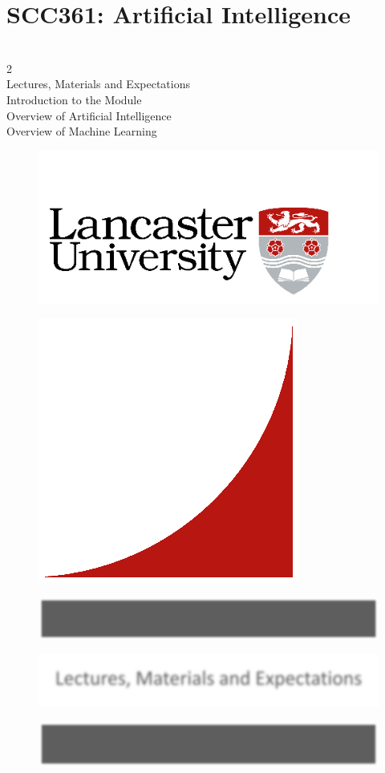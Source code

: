 \documentclass[12pt]{article}
\begin{document}
\section{SCC361: Artificial Intelligence}
\\
2\\
Lectures, Materials and Expectations\\
Introduction to the Module\\
Overview of Artificial Intelligence\\
Overview of Machine Learning\\
\begin{figure}[H]
\includegraphics[width=0.5\linewidth]{page2-image-1.png}
\end{figure}
\begin{figure}[H]
\includegraphics[width=0.5\linewidth]{page2-image-2.png}
\end{figure}
\begin{figure}[H]
\includegraphics[width=0.5\linewidth]{page2-image-3.png}
\end{figure}
\begin{figure}[H]
\includegraphics[width=0.5\linewidth]{page2-image-4.png}
\end{figure}
\begin{figure}[H]
\includegraphics[width=0.5\linewidth]{page2-image-5.png}
\end{figure}
\end{document}
